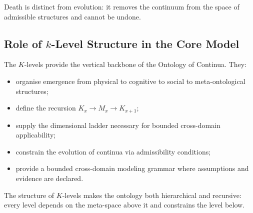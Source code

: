 Death is distinct from evolution: it removes the continuum from the
space of admissible structures and cannot be undone.


\subsection{Role of \texorpdfstring{$k$}{k}-Level Structure in the Core Model}

The $K$-levels provide the vertical backbone of the Ontology of
Continua.
They:
\begin{itemize}
    \item organise emergence from physical to cognitive to social to
          meta-ontological structures;
    \item define the recursion $K_x \to M_x \to K_{x+1}$;
    \item supply the dimensional ladder necessary for bounded cross-domain applicability;
    \item constrain the evolution of continua via admissibility
          conditions;
    \item provide a bounded cross-domain modeling grammar where assumptions and evidence are declared.
\end{itemize}

The structure of $K$-levels makes the ontology both hierarchical and
recursive: every level depends on the meta-space above it and constrains
the level below.

